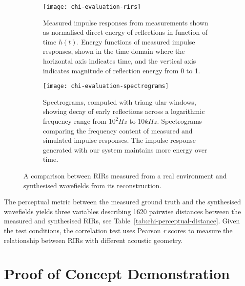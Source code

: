 \begin{figure}[ht]%
    \centering
    \begin{subfigure}[t]{0.49\textwidth}%
        \centering
        \texttt{[image: chi-evaluation-rirs]}%
        \caption{Measured impulse responses from measurements shown as normalised direct energy of reflections in function of time $h(t)$.  Energy functions of measured impulse responses, shown in the time domain where the horizontal axis indicates time, and the vertical axis indicates magnitude of reflection energy from 0 to 1.}%
        \label{fig:direct_energy}%
    \end{subfigure}%
    \hfill
    \begin{subfigure}[t]{0.49\textwidth}%
        \centering
        \texttt{[image: chi-evaluation-spectrograms]}%
        \caption{Spectrograms, computed with triang  ular windows, showing decay of early reflections across a logarithmic frequency range from $10^2Hz$ to $10kHz$. 
        Spectrograms comparing the frequency content of measured and simulated impulse responses. The impulse response generated with our system maintains more energy over time. }%

        \label{fig:spectrograms}%
    \end{subfigure}%
    \caption{A comparison between RIRs measured from a real environment and synthesised wavefields from its reconstruction.}%
    \label{fig:rir_comparison}%
\end{figure}


The perceptual metric between the measured ground truth and the synthesised wavefields yields three variables describing 1620 pairwise distances between the measured and synthesised RIRs, see Table~\ref{tab:chi-perceptual-distance}. Given the test conditions, the correlation test uses Pearson \textit{r} scores to measure the relationship between RIRs with different acoustic geometry.


\section{Proof of Concept Demonstration}


